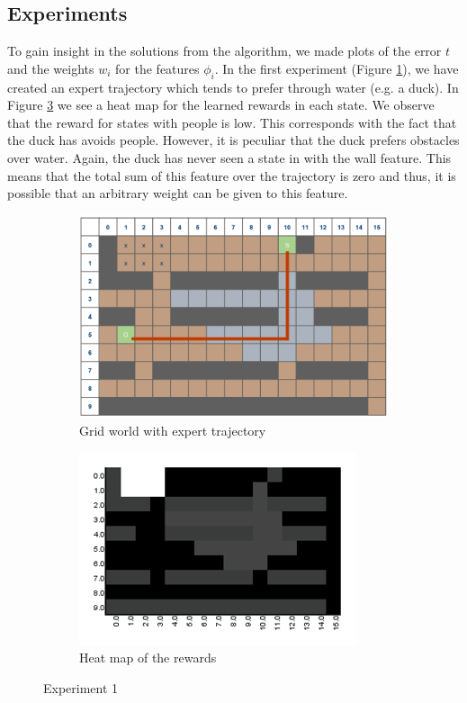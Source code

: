\documentclass[10pt,a4paper,twocolumn]{article}
\begin{document}
\subsection{Experiments}
To gain insight in the solutions from the algorithm, we made plots of the error $t$ and the weights $w_i$ for the features $\phi_i$. In the first experiment (Figure \ref{fig:experiment1trajectory}), we have created an expert trajectory which tends to prefer through water (e.g. a duck). In Figure \ref{fig:experiment1heatmap} we see a heat map for the learned rewards in each state. We observe that the reward for states with people is low. This corresponds with the fact that the duck has avoids people. However, it is peculiar that the duck prefers obstacles over water. Again, the duck has never seen a state in with the wall feature. This means that the total sum of this feature over the trajectory is zero and thus, it is possible that an arbitrary weight can be given to this feature.
\begin{figure}[h]
\begin{subfigure}[b]{0.5\textwidth}
	\includegraphics[width=\textwidth]{experiment_1_gridworld}
	\caption{Grid world with expert trajectory}
	\label{fig:experiment1trajectory}
\end{subfigure}
\begin{subfigure}[b]{0.5\textwidth}
	\includegraphics[width=\textwidth]{experiment_1_heatmap}
	\caption{Heat map of the rewards}
	\label{fig:experiment1heatmap}
\end{subfigure}
\caption{Experiment 1}
\end{figure}
\end{document}

